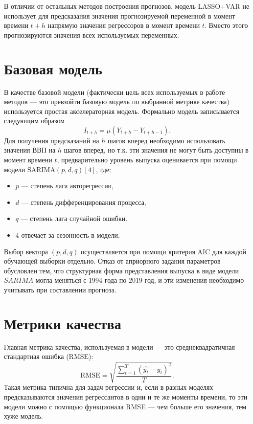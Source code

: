 В отличии от остальных методов построения прогнозов, модель LASSO+VAR не использует для предсказания значения прогнозируемой переменной в момент времени $t+h$ напрямую значения регрессоров в момент времени $t$. Вместо этого прогнозируются значения всех используемых переменных.



\section{Базовая модель}
В качестве базовой модели (фактически цель всех используемых в работе методов --- это превзойти базовую модель по выбранной метрике качества) используется простая акселераторная модель.
Формально модель записывается следующим образом
\begin{equation}
    I_{t+h} =  \mu (Y_{t+h} - Y_{t+h-1}).
\end{equation}
 Для получения предсказаний на $h$ шагов вперед необходимо использовать значения ВВП на $h$ шагов вперед, но т.к. эти значения не могут быть доступны в момент времени $t$, предварительно уровень выпуска оценивается при помощи модели SARIMA$(p,d,q)[4]$, где:
 
 \begin{itemize}
     \item $p$ --- степень лага авторегрессии,
     \item $d$ --- степень дифференцирования процесса,
     \item $q$ --- степень лага случайной ошибки.
     \item $4$ отвечает за сезонность в модели.
 \end{itemize} 
Выбор вектора $(p,  d, q)$ осуществляется при помощи критерия AIC для каждой обучающей выборки отдельно. Отказ от априорного задания параметров обусловлен тем, что структурная форма представления выпуска в виде модели $SARIMA$ могла меняться с 1994 года по 2019 год, и эти изменения необходимо учитывать при составлении прогноза.
\section{Метрики качества}
Главная метрика качества, используемая в модели --- это среднеквадратичная стандартная ошибка (RMSE):
\begin{equation}
  \text{RMSE} = \sqrt{ \frac{\sum_{t = 1}^{T} (\hat{y_t} - y_t)^2}{T}}.
\end{equation}
Такая метрика типична для задач регрессии и, если в разных моделях предсказываются значения регрессантов в одни и те же моменты времени, то эти модели можно с помощью функционала RMSE --- чем больше его значения, тем хуже модель.

